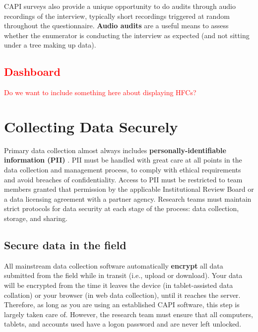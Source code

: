 {CAPI surveys also provide a unique opportunity to do audits through audio recordings of the interview, typically short recordings triggered at random throughout the questionnaire. 
\textbf{Audio audits} are a useful means to assess whether the enumerator is conducting the interview as expected (and not sitting under a tree making up data).

\textcolor{red}{
\subsection{Dashboard}
Do we want to include something here about displaying HFCs? }


\section{Collecting Data Securely}
Primary data collection almost always includes  \textbf{personally-identifiable information (PII)} 
. 
PII must be handled with great care at all points in the data collection and management process, to comply with ethical requirements and avoid breaches of confidentiality. Access to PII must be restricted to team members granted that permission by the applicable Institutional Review Board or a data licensing agreement with a partner agency. Research teams must maintain strict protocols for data security at each stage of the process: data collection, storage, and sharing. 

\subsection{Secure data in the field}
All mainstream data collection software automatically \textbf{encrypt}
all data submitted from the field while in transit (i.e., upload or download).  Your data will be encrypted from the time it leaves the device (in tablet-assisted data collation) or your browser (in web data collection), until it reaches the server. Therefore, as long as you are using an established CAPI software, this step is largely taken care of. However, the research team must ensure that all computers, tablets, and accounts used have a logon password and are never left unlocked. 

}
